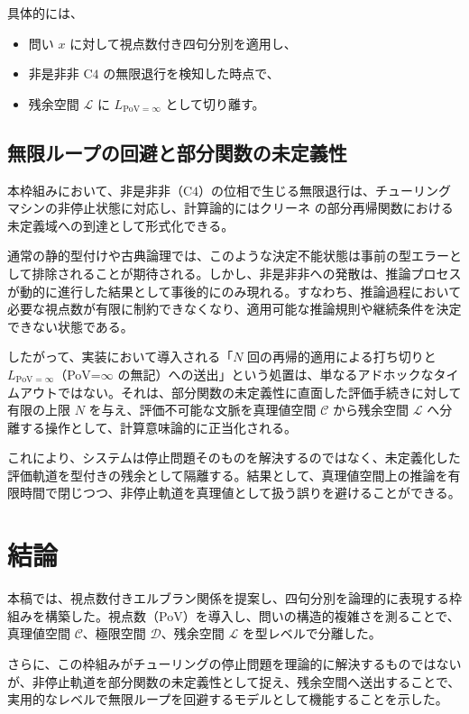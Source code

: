 \documentclass[11pt,a4paper]{article}
\newcommand{\C}{\mathcal{C}}
\newcommand{\Lspace}{\mathcal{L}}
\newcommand{\Cfour}{\text{C4}}
\newcommand{\Linfty}{L_{\text{PoV}=\infty}}
\begin{document}
具体的には、
\begin{itemize}
\item 問い $x$ に対して視点数付き四句分別を適用し、
\item 非是非非 $\Cfour$ の無限退行を検知した時点で、
\item 残余空間 $\Lspace$ に $L_{\text{PoV}=\infty}$ として切り離す。
\end{itemize}


\subsection{無限ループの回避と部分関数の未定義性}
\label{subsec:practical-avoidance}

本枠組みにおいて、非是非非（$\Cfour$）の位相で生じる無限退行は、チューリングマシンの非停止状態に対応し、計算論的にはクリーネ \cite{Kleene1952} の部分再帰関数における未定義域への到達として形式化できる。

通常の静的型付けや古典論理では、このような決定不能状態は事前の型エラーとして排除されることが期待される。しかし、非是非非への発散は、推論プロセスが動的に進行した結果として事後的にのみ現れる。すなわち、推論過程において必要な視点数が有限に制約できなくなり、適用可能な推論規則や継続条件を決定できない状態である。

したがって、実装において導入される「$N$ 回の再帰的適用による打ち切りと $\Linfty$（PoV=$\infty$ の無記）への送出」という処置は、単なるアドホックなタイムアウトではない。それは、部分関数の未定義性に直面した評価手続きに対して有限の上限 $N$ を与え、評価不可能な文脈を真理値空間 $\C$ から残余空間 $\Lspace$ へ分離する操作として、計算意味論的に正当化される。

これにより、システムは停止問題そのものを解決するのではなく、未定義化した評価軌道を型付きの残余として隔離する。結果として、真理値空間上の推論を有限時間で閉じつつ、非停止軌道を真理値として扱う誤りを避けることができる。

\section{結論}
\label{sec:conclusion}

本稿では、視点数付きエルブラン関係を提案し、四句分別を論理的に表現する枠組みを構築した。視点数（PoV）を導入し、問いの構造的複雑さを測ることで、真理値空間 $\C$、極限空間 $\mathcal{D}$、残余空間 $\Lspace$ を型レベルで分離した。

さらに、この枠組みがチューリングの停止問題を理論的に解決するものではないが、非停止軌道を部分関数の未定義性として捉え、残余空間へ送出することで、実用的なレベルで無限ループを回避するモデルとして機能することを示した。
\end{document}
